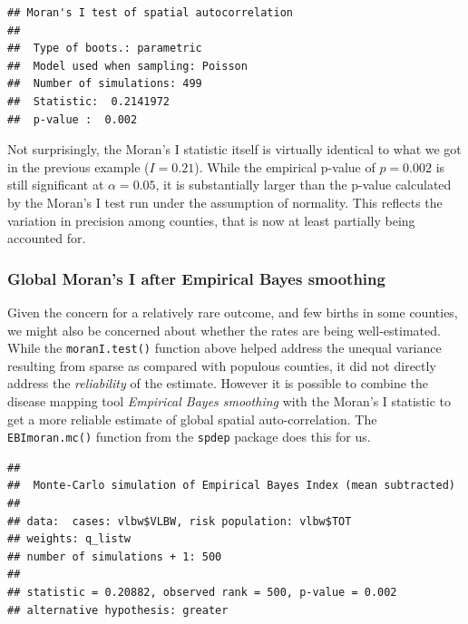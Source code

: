 \documentclass[
]{book}
\newenvironment{Shaded}{\begin{snugshade}}{\end{snugshade}}
\newcommand{\AttributeTok}[1]{\textcolor[rgb]{0.13,0.29,0.53}{#1}}
\newcommand{\DecValTok}[1]{\textcolor[rgb]{0.00,0.00,0.81}{#1}}
\newcommand{\FunctionTok}[1]{\textcolor[rgb]{0.13,0.29,0.53}{\textbf{#1}}}
\newcommand{\NormalTok}[1]{#1}
\newcommand{\OtherTok}[1]{\textcolor[rgb]{0.56,0.35,0.01}{#1}}
\newcommand{\SpecialCharTok}[1]{\textcolor[rgb]{0.81,0.36,0.00}{\textbf{#1}}}
\begin{document}
\begin{verbatim}
## Moran's I test of spatial autocorrelation 
## 
##  Type of boots.: parametric 
##  Model used when sampling: Poisson 
##  Number of simulations: 499 
##  Statistic:  0.2141972 
##  p-value :  0.002
\end{verbatim}

Not surprisingly, the Moran's I statistic itself is virtually identical to what we got in the previous example (\(I=0.21\)). While the empirical p-value of \(p=0.002\) is still significant at \(\alpha = 0.05\), it is substantially larger than the p-value calculated by the Moran's I test run under the assumption of normality. This reflects the variation in precision among counties, that is now at least partially being accounted for.

\hypertarget{global-morans-i-after-empirical-bayes-smoothing}{%
\subsubsection{Global Moran's I after Empirical Bayes smoothing}\label{global-morans-i-after-empirical-bayes-smoothing}}

Given the concern for a relatively rare outcome, and few births in some counties, we might also be concerned about whether the rates are being well-estimated. While the \texttt{moranI.test()} function above helped address the unequal variance resulting from sparse as compared with populous counties, it did not directly address the \emph{reliability} of the estimate. However it is possible to combine the disease mapping tool \emph{Empirical Bayes smoothing} with the Moran's I statistic to get a more reliable estimate of global spatial auto-correlation. The \texttt{EBImoran.mc()} function from the \texttt{spdep} package does this for us.

\begin{Shaded}
\end{Shaded}

\begin{verbatim}
## 
##  Monte-Carlo simulation of Empirical Bayes Index (mean subtracted)
## 
## data:  cases: vlbw$VLBW, risk population: vlbw$TOT
## weights: q_listw
## number of simulations + 1: 500
## 
## statistic = 0.20882, observed rank = 500, p-value = 0.002
## alternative hypothesis: greater
\end{verbatim}
\end{document}
